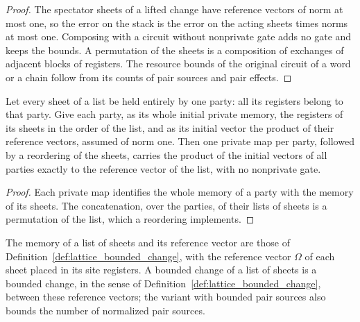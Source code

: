 \begin{proof}\leanok
    The spectator sheets of a lifted change have reference vectors of norm at most
    one, so the error on the stack is the error on the acting sheets times norms at
    most one. Composing with a circuit without nonprivate gate adds no gate and
    keeps the bounds. A permutation of the sheets is a composition of exchanges of
    adjacent blocks of registers. The resource bounds of the original circuit of a
    word or a chain follow from its counts of pair sources and pair effects.
\end{proof}

\begin{lemma}
    \label{thm:lattice_stack_initialization}
    \leanok
    Let every sheet of a list be held entirely by one party: all its registers belong
    to that party. Give each party, as its whole initial private memory, the
    registers of its sheets in the order of the list, and as its initial vector the
    product of their reference vectors, assumed of norm one. Then one private map per
    party, followed by a reordering of the sheets, carries the product of the initial
    vectors of all parties exactly to the reference vector of the list, with no
    nonprivate gate.
\end{lemma}

\begin{proof}\leanok
    Each private map identifies the whole memory of a party with the memory of its
    sheets. The concatenation, over the parties, of their lists of sheets is a
    permutation of the list, which a reordering implements.
\end{proof}

\begin{definition}
    \label{def:lattice_sheet_stack}
    \leanok
    The memory of a list of sheets and its reference vector are those of
    Definition~\ref{def:lattice_bounded_change}, with the reference vector $\Omega$ of
    each sheet placed in its site registers. A bounded change of a list of
    sheets is a bounded change, in the sense of
    Definition~\ref{def:lattice_bounded_change}, between these reference vectors;
    the variant with bounded pair sources also bounds the number of normalized
    pair sources.
\end{definition}

